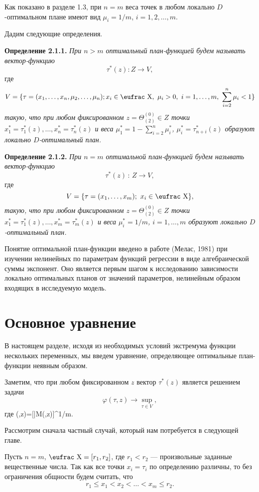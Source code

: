 Как показано в разделе 1.3, при $n=m$ веса точек в любом локально
$D$-оптимальном плане имеют вид $\mu_i=1/m$, $i=1,2,\ldots,m$.

Дадим следующие определения.

{\bf Определение 2.1.1.} {\it При $n>m$ оптимальный план-функцией
будем называть вектор-функцию}
$$
\tau^*(z): Z\to V,
$$
где
$$
V=\{\tau=(x_1,\ldots,x_n,\mu_2,\ldots,\mu_n); x_i\in{\mbox{\eufrac
X}},\,\, \mu_i>0,\,\, i=1,\ldots,m,\,\, \sum^n_{i=2}\mu_i<1\}
$$
{\it такую, что при любом фиксированном $z=\Theta^{(0)}_{(2)}\in Z$
точки $x_1^*=\tau^*_1(z),\ldots,x^*_n=\tau^*_n(z)$ и веса
$\mu^*_1=1-\sum^n_{i=2}\mu_i^*$, $\mu^*_i=\tau^*_{n+i}(z)$ образуют
локально $D$-оптимальный план.}

{\bf Определение 2.1.2.} {\it При $n=m$ оптимальной план-функцией
будем называть вектор-функцию}
$$
\tau^*(z)\,:\,Z\to V,
$$
где
$$
V=\{\tau=(x_1,\ldots,x_m);\,\, x_i\in{\mbox{\eufrac X}}\},
$$
{\it такую, что при любом фиксированном $z=\Theta^{(0)}_{(2)}\in Z$
точки $x^*_1=\tau^*_1(z),\ldots,x^*_m=\tau^*_m(z)$ и веса
$\mu^*_i=1/m$, $i=1,\ldots,m$ образуют локально $D$-оптимальный
план.}

Понятие оптимальной план-функции введено в работе (Мелас, 1981) при
изучении нелинейных по параметрам функций регрессии в виде
алгебраической суммы экспонент. Оно является первым шагом к
исследованию зависимости локально оптимальных планов от значений
параметров, нелинейным образом входящих в исследуемую модель.


\section{Основное уравнение}

В настоящем разделе, исходя из необходимых условий экстремума
функции нескольких переменных, мы введем уравнение, определяющее
оптимальные план-функции неявным образом.

Заметим, что при любом фиксированном $z$ вектор $\tau^*(z)$ является
решением задачи
$$
\varphi(\tau,z)\to \sup_{\tau\in V},
$$
где \beq \varphi(\tau,z)=[\det \bar M(\xi,z)]^{1/m}. \label{eq:A73}
\eeq

Рассмотрим сначала частный случай, который нам потребуется в
следующей главе.

Пусть $n=m$, ${\mbox{\eufrac X}}=[r_1,r_2]$, где $r_1< r_2$ ---
произвольные заданные вещественные числа. Так как все точки
$x_i=\tau_i$ по определению различны, то без ограничения общности
будем считать, что
$$
r_1\leq x_1<x_2<\ldots<x_m\leq r_2.
$$

